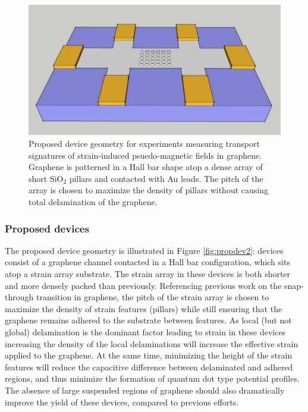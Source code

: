 \documentclass[edeposit,fullpage,draftthesis]{uiucthesis2009}
\begin{document}
            \begin{figure}
            \centering
            \includegraphics[width=0.4\columnwidth]{images/futurework/ProposedDevice2_crop}
            \caption[Proposed device geometry for pseudo-magnetic field experiments]{
            Proposed device geometry for experiments measuring transport signatures of
            strain-induced psuedo-magnetic fields in graphene. Graphene is patterned in a 
            Hall bar shape atop a dense array of short SiO$_2$ pillars and contacted with Au leads. 
            The pitch of the array is chosen to maximize the density of pillars without causing total delamination of 
            the graphene.
            }
            \label{fig:propdev3}
            \end{figure}
        
            \subsubsection*{Proposed devices}
            
            The proposed device geometry is illustrated in Figure \ref{fig:propdev2}: devices consist of 
            a graphene channel contacted in a Hall bar configuration, which
            sits atop a strain array substrate. The strain array in these devices is both shorter
            and more densely packed than previously. Referencing previous work \cite{gill2015mechanical}
            on the snap-through transition in graphene, the pitch of the strain array is chosen to 
            maximize the density of strain features (pillars) while still ensuring that the 
            graphene remains adhered to the substrate between features. As local (but not global)
            delamination is the dominant factor leading to strain in these devices increasing
            the density of the local delaminations will increase the effective strain applied to
            the graphene. At the same time, minimizing the height of the strain features will
            reduce the capacitive difference between delaminated and adhered regions, and thus minimize
            the formation of quantum dot type potential profiles.
            The absence of large suspended regions of graphene should also dramatically improve
            the yield of these devices, compared to previous efforts.
            
\end{document}
